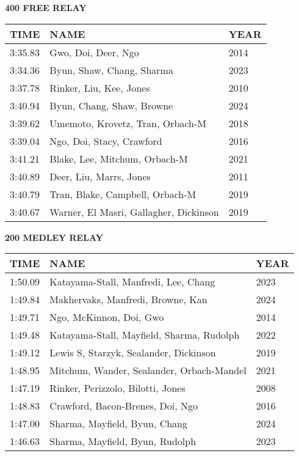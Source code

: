 \begin{center}
\begin{minipage}[t]{0.7\textwidth}
\centering
\textbf{400 FREE RELAY}\\[0.05cm]
\begin{tabular}{@{}p{1.8cm}p{2.8cm}p{1.2cm}@{}}
\hline
\textbf{TIME} & \textbf{NAME} & \textbf{YEAR} \\
\hline
3:35.83 & Gwo, Doi, Deer, Ngo & 2014 \\
3:34.36 & Byun, Shaw, Chang, Sharma & 2023 \\
3:37.78 & Rinker, Liu, Kee, Jones & 2010 \\
3:40.94 & Byun, Chang, Shaw, Browne & 2024 \\
3:39.62 & Umemoto, Krovetz, Tran, Orbach-M & 2018 \\
3:39.04 & Ngo, Doi, Stacy, Crawford & 2016 \\
3:41.21 & Blake, Lee, Mitchum, Orbach-M & 2021 \\
3:40.89 & Deer, Liu, Marrs, Jones & 2011 \\
3:40.79 & Tran, Blake, Campbell, Orbach-M & 2019 \\
3:40.67 & Warner, El Masri, Gallagher, Dickinson & 2019 \\
\hline
\end{tabular}
\end{minipage}
\end{center}

\vspace{0.4cm}

\begin{center}
\begin{minipage}[t]{0.7\textwidth}
\centering
\textbf{200 MEDLEY RELAY}\\[0.05cm]
\begin{tabular}{@{}p{1.8cm}p{2.8cm}p{1.2cm}@{}}
\hline
\textbf{TIME} & \textbf{NAME} & \textbf{YEAR} \\
\hline
1:50.09 & Katayama-Stall, Manfredi, Lee, Chang & 2023 \\
1:49.84 & Makhervaks, Manfredi, Browne, Kan & 2024 \\
1:49.71 & Ngo, McKinnon, Doi, Gwo & 2014 \\
1:49.48 & Katayama-Stall, Mayfield, Sharma, Rudolph & 2022 \\
1:49.12 & Lewis S, Starzyk, Sealander, Dickinson & 2019 \\
1:48.95 & Mitchum, Wander, Sealander, Orbach-Mandel & 2021 \\
1:47.19 & Rinker, Perizzolo, Bilotti, Jones & 2008 \\
1:48.83 & Crawford, Bacon-Brenes, Doi, Ngo & 2016 \\
1:47.00 & Sharma, Mayfield, Byun, Chang & 2024 \\
1:46.63 & Sharma, Mayfield, Byun, Rudolph & 2023 \\
\hline
\end{tabular}
\end{minipage}
\end{center}

